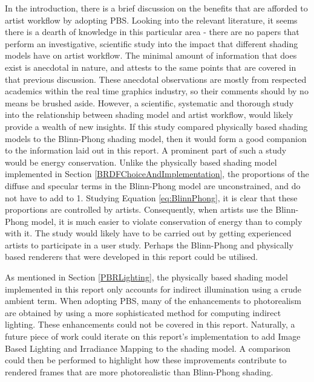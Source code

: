 In the introduction, there is a brief discussion on the benefits that are afforded to artist workflow by adopting PBS. Looking into the relevant literature, it seems there is a dearth of knowledge in this particular area - there are no papers that perform an investigative, scientific study into the impact that different shading models have on artist workflow. The minimal amount of information that does exist is anecdotal in nature, and attests to the same points that are covered in that previous discussion. These anecdotal observations are mostly from respected academics within the real time graphics industry, so their comments should by no means be brushed aside. However, a scientific, systematic and thorough study into the relationship between shading model and artist workflow, would likely provide a wealth of new insights. If this study compared physically based shading models to the Blinn-Phong shading model, then it would form a good companion to the information laid out in this report. A prominent part of such a study would be energy conservation. Unlike the physically based shading model implemented in Section \ref{BRDFChoiceAndImplementation}, the proportions of the diffuse and specular terms in the Blinn-Phong model are unconstrained, and do not have to add to 1. Studying Equation \ref{eq:BlinnPhong}, it is clear that these proportions are controlled by artists. Consequently, when artists use the Blinn-Phong model, it is much easier to violate conservation of energy than to comply with it. The study would likely have to be carried out by getting experienced artists to participate in a user study. Perhaps the Blinn-Phong and physically based renderers that were developed in this report could be utilised.

As mentioned in Section \ref{PBRLighting}, the physically based shading model implemented in this report only accounts for indirect illumination using a crude ambient term. When adopting PBS, many of the enhancements to photorealism are obtained by using a more sophisticated method for computing indirect lighting. These enhancements could not be covered in this report. Naturally, a future piece of work could iterate on this report's implementation to add Image Based Lighting and Irradiance Mapping to the shading model. A comparison could then be performed to highlight how these improvements contribute to rendered frames that are more photorealistic than Blinn-Phong shading.